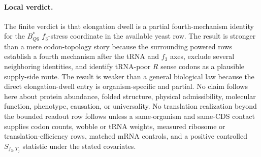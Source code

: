 \paragraph{Local verdict.}
The finite verdict is that elongation dwell is a partial fourth-mechanism identity for the $B^{\ast}_{Q6}$ $f_3$-stress coordinate in the available yeast row.  The result is stronger than a mere codon-topology story because the surrounding powered rows establish a fourth mechanism after the tRNA and $f_3$ axes, exclude several neighboring identities, and identify tRNA-poor $R$ sense codons as a plausible supply-side route.  The result is weaker than a general biological law because the direct elongation-dwell entry is organism-specific and partial.  No claim follows here about protein abundance, folded structure, physical admissibility, molecular function, phenotype, causation, or universality.  No translation realization beyond the bounded readout row follows unless a same-organism and same-CDS contact supplies codon counts, wobble or tRNA weights, measured ribosome or translation-efficiency rows, matched mRNA controls, and a positive controlled $S_{f_3,T_j}$ statistic under the stated covariates.